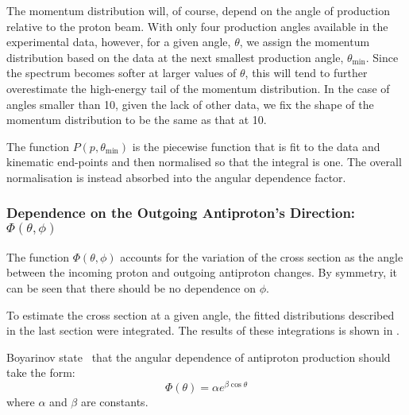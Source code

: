 The momentum distribution will, of course, depend on the angle of production relative to the proton beam.
With only four production angles available in the experimental data, however, for a given angle, $\theta$, we assign the momentum distribution based on the data at the next smallest production angle, $\theta_\textrm{min}$.
Since the spectrum becomes softer at larger values of $\theta$, this will tend to further overestimate the high-energy tail of the momentum distribution.
In the case of angles smaller than 10\degree, given the lack of other data, we fix the  shape of the momentum distribution to be the same as that at 10\degree.

The function $P(p,\theta_\textrm{min})$ is the piecewise function that is fit to the data and kinematic end-points and then normalised so that the integral is one.
The overall normalisation is instead absorbed into the angular dependence factor.

\subsubsection*{Dependence on the Outgoing Antiproton's Direction: $\Phi(\theta,\phi)$}
\FigAntiprotonAngularDependence
The function $\Phi(\theta,\phi)$ accounts for the variation of the cross section as the angle between the incoming proton and outgoing antiproton changes.
By symmetry, it can be seen that there should be no dependence on $\phi$.

To estimate the cross section at a given angle, the fitted distributions described in the last section were integrated.
The results of these integrations is shown in .

Boyarinov \etal state~\cite{Boyarinov:1994tp} that the angular dependence of antiproton production should take the form:
\begin{equation}
\Phi(\theta)=\alpha e^{\beta\cos\theta}
\end{equation}
where $\alpha$ and $\beta$ are constants. 

